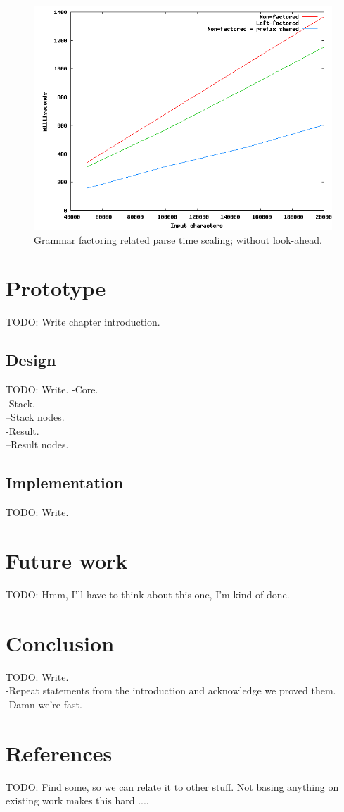 \documentclass[a4paper,10pt]{article}
\begin{document}
\begin{figure}[H]
\centering
\includegraphics[scale=0.5]{grammar-factoring.png}
\caption{Grammar factoring related parse time scaling; without look-ahead.}
\end{figure}

\section{Prototype}

TODO: Write chapter introduction.

\subsection{Design}

TODO: Write.
-Core.\\
-Stack.\\
--Stack nodes.\\
-Result.\\
--Result nodes.

\subsection{Implementation}

TODO: Write.

\section{Future work}

TODO: Hmm, I'll have to think about this one, I'm kind of done.

\section{Conclusion}

TODO: Write.\\
-Repeat statements from the introduction and acknowledge we proved them.\\
-Damn we're fast.

\section{References}

TODO: Find some, so we can relate it to other stuff. Not basing anything on existing work makes this hard ....
\end{document}
